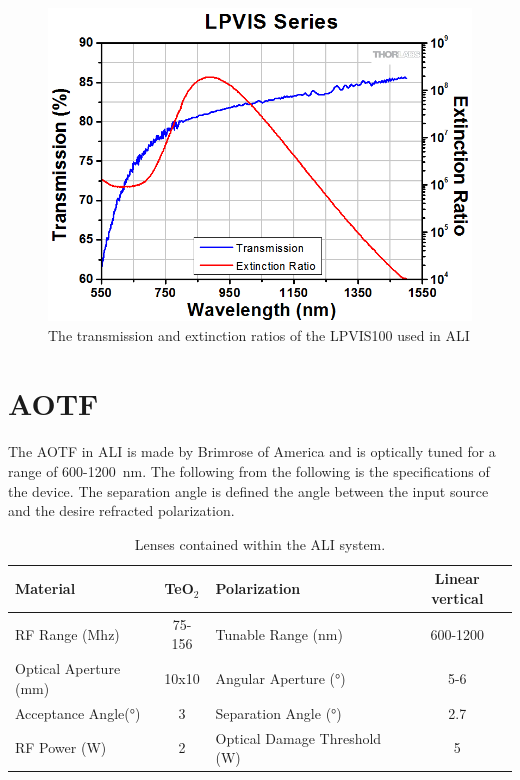 \begin{figure}
    \includegraphics[width=1.0\textwidth]{./Images/A-2-PolarizerExtinctionRatio.png}
    \caption[Linear Polarizer Transmission and Extinction Ratios]{The transmission and extinction ratios of the LPVIS100 used in ALI}
    \label{fig:A.2:LinearPolarizer}
\end{figure}

\section{AOTF}

The AOTF in ALI is made by Brimrose of America and is optically tuned for a range of 600-1200~nm. The following from the following is the specifications of the device. The separation angle is defined the angle between the input source and the desire refracted polarization.

\begin{table}
    \begin{center}
    \begin{tabular}{|l|c|l|c|}
    \hline
    Material & TeO$_{2}$ & Polarization & Linear vertical \\
    \hline
    RF Range (Mhz) & 75-156 & Tunable Range (nm) & 600-1200 \\
    \hline
    Optical Aperture (mm) & 10x10 & Angular Aperture (\si{\degree}) & 5-6 \\
    \hline
    Acceptance Angle(\si{\degree}) & 3 & Separation Angle (\si{\degree}) & 2.7 \\ 
    \hline
    RF Power (W) & 2 & Optical Damage Threshold (W) & 5 \\
    \hline
    \end{tabular}
    \end{center}
    \caption[ALI System Lenses]{Lenses contained within the ALI system.}
    \label{tab:A.1:BrimroseAOTF}
\end{table}

